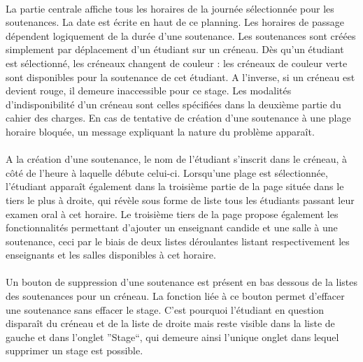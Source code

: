 \documentclass[a4paper,10pt]{report}
\begin{document}
	      \paragraph{}
		La partie centrale affiche tous les horaires de la journée sélectionnée pour les soutenances.
		La date est écrite en haut de ce planning.
		Les horaires de passage dépendent logiquement de la durée d'une soutenance.
		Les soutenances sont créées simplement par déplacement d'un étudiant sur un créneau.
		Dès qu'un étudiant est sélectionné, les créneaux changent de couleur : les créneaux de couleur verte sont disponibles pour la soutenance de cet étudiant.
		A l'inverse, si un créneau est devient rouge, il demeure inaccessible pour ce stage.
		Les modalités d'indisponibilité d'un créneau sont celles spécifiées dans la deuxième partie du cahier des charges.
		En cas de tentative de création d'une soutenance à une plage horaire bloquée, un message expliquant la nature du problème apparaît.
		
	      \paragraph{}
		A la création d'une soutenance, le nom de l'étudiant s'inscrit dans le créneau, à côté de l'heure à laquelle débute celui-ci.
		Lorsqu'une plage est sélectionnée, l'étudiant apparaît également dans la troisième partie de la page située dans le tiers le plus à droite, qui révèle sous forme de liste tous les étudiants passant leur examen oral à cet horaire.
		Le troisième tiers de la page propose également les fonctionnalités permettant d'ajouter un enseignant candide et une salle à une soutenance, ceci par le biais de deux listes déroulantes listant respectivement les enseignants et les salles disponibles à cet horaire.	
		
	      \paragraph{}
		Un bouton de suppression d'une soutenance est présent en bas dessous de la listes des soutenances pour un créneau.
		La fonction liée à ce bouton permet d'effacer une soutenance sans effacer le stage.
		C'est pourquoi l'étudiant en question disparaît du créneau et de la liste de droite mais reste visible dans la liste de gauche et dans l'onglet ''Stage``, qui demeure ainsi l'unique onglet dans lequel supprimer un stage est possible.
		
		~\\
		~\\
		~\\
		~\\
		~\\
\end{document}
